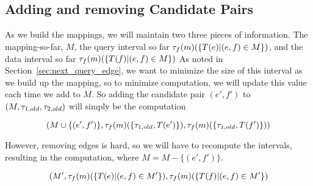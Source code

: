 \subsection{Adding and removing Candidate Pairs}

As we build the mappings, we will maintain two three pieces of information.  The
mapping-so-far, $M$, the query interval so far $\tau_f(m)(\{ T(e) | (e,f)
\in M\})$, and the data interval so far $\tau_f(m)(\{ T(f) | (e,f) \in M\})$
As noted in Section~\ref{sec:next_query_edge}, we want to minimize the size of
this interval as we build up the mapping, so to minimize computation, we will
update this value each time we add to $M$. So adding the candidate pair
$(e',f')$ to $(M, \tau_{1,old},\tau_{2,old} )$ will simply be the
computation

\[(M \cup \{(e',f')\}, \tau_f(m)(\{\tau_{1,old}, T(e')\}),
\tau_f(m)(\{\tau_{1,old}, T(f')\}) )\]

However, removing edges is hard, so we will have to recompute the intervals,
resulting in the computation, where $M = M - \{(e',f')\}$.

\[
  (M',
    \tau_f(m)(\{ T(e) | (e,f) \in M'\}),
    \tau_f(m)(\{ T(f) | (e,f) \in M'\})
\]

